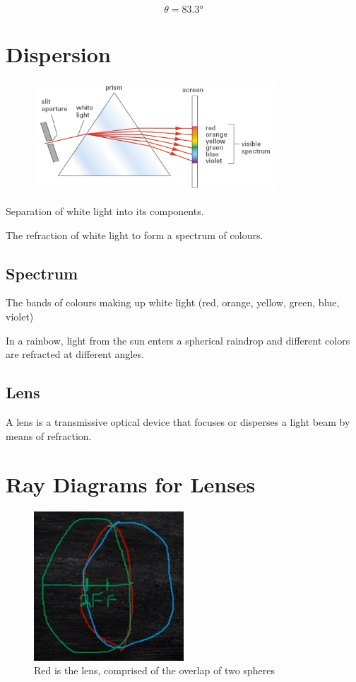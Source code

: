 \documentclass[a4paper,12pt]{article}
\begin{document}
$$\theta = \ang{83.3}$$

\pagebreak
\section{Dispersion}
\begin{figure}[H]
    \centering
    \includegraphics[width=0.8\textwidth]{dispersion}
\end{figure}

Separation of white light into its components.

The refraction of white light to form a spectrum of colours.

\subsection{Spectrum}
The bands of colours making up white light (red, orange, yellow, green, blue, violet)

In a rainbow, light from the sun enters a spherical raindrop and different colors are refracted at different angles.

\subsection{Lens}
A lens is a transmissive optical device that focuses or disperses a light beam by means of refraction.

\pagebreak
\section{Ray Diagrams for Lenses}
\begin{figure}[H]
    \centering
    \includegraphics[width=0.50\textwidth]{lens}
    \caption{Red is the lens, comprised of the overlap of two spheres}
\end{figure}
\end{document}
